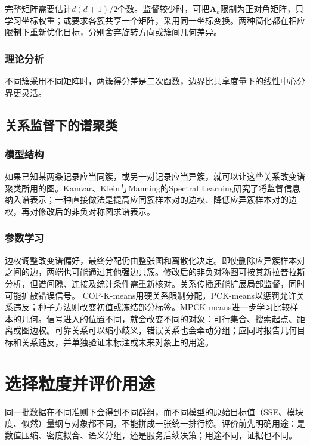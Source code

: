 完整矩阵需要估计$d(d+1)/2$个数。监督较少时，可把$\bm A_k$限制为正对角矩阵，只学习坐标权重；或要求各簇共享一个矩阵，采用同一坐标变换。两种简化都在相应限制下重新优化目标，分别舍弃旋转方向或簇间几何差异。
\subsubsection{理论分析}

不同簇采用不同矩阵时，两簇得分差是二次函数，边界比共享度量下的线性中心分界更灵活。

\subsection{关系监督下的谱聚类}

\subsubsection{模型结构}

如果已知某两条记录应当同簇，或另一对记录应当异簇，就可以让这些关系改变谱聚类所用的图。Kamvar、Klein与Manning的Spectral Learning研究了将监督信息纳入谱表示；一种直接做法是提高应同簇样本对的边权、降低应异簇样本对的边权，再对修改后的非负对称图求谱表示。

\subsubsection{参数学习}

边权调整改变谱偏好，最终分配仍由整张图和离散化决定。即使删除应异簇样本对之间的边，两端也可能通过其他强边共簇。修改后的非负对称图可按其新拉普拉斯分析，但谱间隙、连接及统计条件需重新核对。关系传播还能扩展局部监督，同时可能扩散错误信号。
COP-K-means用硬关系限制分配，PCK-means以惩罚允许关系违反；种子方法则改变初值或冻结部分标签。MPCK-means进一步学习比较样本的几何。信号进入的位置不同，就会改变不同的对象：可行集合、搜索起点、距离或图边权。可靠关系可以缩小歧义，错误关系也会牵动分组；应同时报告几何目标和关系违反，并单独验证未标注或未来对象上的用途。
\section{选择粒度并评价用途}
\label{sec:clustering-evaluation}

同一批数据在不同准则下会得到不同群组，而不同模型的原始目标值（SSE、模块度、似然）量纲与对象都不同，不能拼成一张统一排行榜。评价前先明确用途：是数值压缩、密度拟合、语义分组，还是服务后续决策；用途不同，证据也不同。

